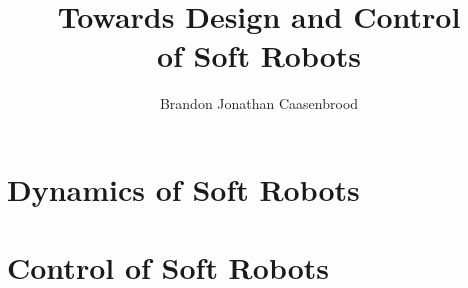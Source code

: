 \documentclass[10pt]{phd}
\title{Towards Design and Control \\ of Soft Robots}
\author{Brandon Jonathan Caasenbrood}
\begin{document}
%

\chapter{Dynamics of Soft Robots}
\label{ch:2-dynamics} 
	
	
	
\chapter{Control of Soft Robots}
	
	

\appendix
%
%


\end{document}
